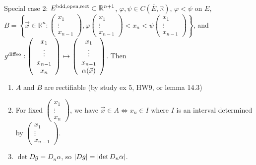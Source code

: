 \documentclass[10pt,letterpaper]{article}
\newcommand{\n}{\hfill\break}
\newcommand{\ptxt}[1]{\textrm{\textnormal{#1}}}
\newcommand{\set}[1]{\left\{#1\right\}}
\newcommand{\reals}{\mathbb{R}}
\newcommand{\R}{\reals}
\let\deg\relax
\DeclareMathOperator{\deg}{deg}
\newcommand{\abs}[1]{\left|#1\right|}
\newcommand{\closure}[1]{\overline{#1}}
\newcommand{\paren}[1]{\left(#1\right)}
\begin{document}
\par\noindent Special case 2: $E^{\ptxt{bdd},\ptxt{open},\ptxt{rect}}\subset\R^{n+1}$, $\varphi,\psi\in{}C(\closure{E},\R)$, $\varphi<\psi$ on $E$,\n
$B=\set{\vec{x}\in\R^{n}:\paren{\begin{array}{c}x_{1}\\ \vdots\\ x_{n-1}\end{array}},\varphi\paren{\begin{array}{c}x_{1}\\ \vdots\\ x_{n-1}\end{array}}<x_{n}<\psi\paren{\begin{array}{c}x_{1}\\ \vdots\\ x_{n-1}\end{array}}}$, and $g^{\ptxt{diffeo}}:\paren{\begin{array}{c}x_{1}\\ \vdots\\ x_{n-1}\\ x_{n}\end{array}}\mapsto\paren{\begin{array}{c}x_{1}\\ \vdots\\ x_{n-1}\\ \alpha(\vec{x})\end{array}}$.\n
Then
\begin{enumerate}[label=(\alph*)]
	\item $A$ and $B$ are rectifiable (by study ex 5, HW9, or lemma 14.3)
	\item For fixed $\paren{\begin{array}{c}x_{1}\\ \vdots\\ x_{n}\end{array}}$, we have $\vec{x}\in{}A\Leftrightarrow{}x_{n}\in{}I$ where $I$ is an interval determined by $\paren{\begin{array}{c}x_{1}\\ \vdots\\ x_{n-1}\end{array}}$.
	\item $\det{}Dg=D_{n}\alpha$, so $\abs{\deg{}Dg}=\abs{\det{}D_{n}\alpha}$.
\end{enumerate}
\end{document}

